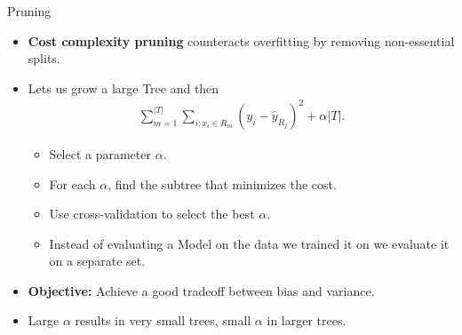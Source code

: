 \documentclass[10pt]{beamer}
\begin{document}
\begin{frame}{Pruning}
    \begin{itemize}
        \item \textbf{Cost complexity pruning} counteracts overfitting by removing non-essential splits.
        \item Lets us grow a large Tree and then
              \begin{align*}
                  \sum_{m=1}^{|T|} \sum_{i: x_i \in R_m} (y_i - \hat{y}_{R_j})^2 + \alpha|T|.
              \end{align*}
              \begin{itemize}
                  \item Select a parameter \( \alpha \).
                  \item For each \( \alpha \), find the subtree that minimizes the cost.
                  \item Use cross-validation to select the best \( \alpha \).
                  \item Instead of evaluating a Model on the data we trained it on we evaluate it on a separate set.
              \end{itemize}
        \item \textbf{Objective:} Achieve a good tradeoff between bias and variance.
        \item Large \( \alpha \) results in very small trees, small \( \alpha \) in larger trees.
    \end{itemize}
\end{frame}
\end{document}
